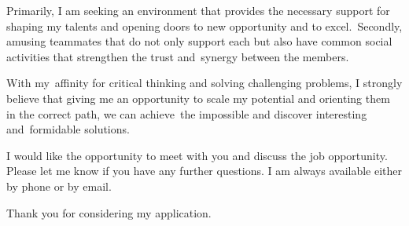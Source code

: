Primarily, I am seeking an environment that provides the necessary support for shaping my talents and opening doors to new opportunity and to excel. Secondly, amusing teammates that do not only support each but also have common social activities that strengthen the trust and synergy between the members.


With my affinity for critical thinking and solving challenging problems, I strongly believe that giving me an opportunity to scale my potential and orienting them in the correct path, we can achieve the impossible and discover interesting and formidable solutions.


I would like the opportunity to meet with you and discuss the job opportunity. Please let me know if you have any further questions. I am always available either by phone or by email.

Thank you for considering my application.







	{\bfseries \firstname~\familyname}\\
%
\vfill%

